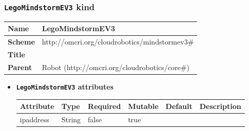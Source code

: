 \subsubsection{\texttt{LegoMindstormEV3} kind}
\begin{center}
\begin{tabular}{|l|l|}
  \hline
  \textbf{Name} & LegoMindstormEV3 \\
  \hline  
  \textbf{Scheme} & http://omcri.org/cloudrobotics/mindstormev3\# \\
  \hline
  \textbf{Title} &  \\
  \hline
  \textbf{Parent} & Robot (http://omcri.org/cloudrobotics/core\#) \\
  \hline
\end{tabular}
\end{center}
\begin{itemize}
\item \textbf{\texttt{LegoMindstormEV3} attributes}

\begin{tabularx}{\textwidth}{|l|l|p{1.4cm}|p{1.3cm}|l|X|}
  \hline
  \textbf{Attribute} & \textbf{Type} & \textbf{Required} & \textbf{Mutable} & \textbf{Default} & \textbf{Description} \\
  \hline  
  ipaddress & String & false & true &  &  \\
  \hline
\end{tabularx}
\end{itemize}



